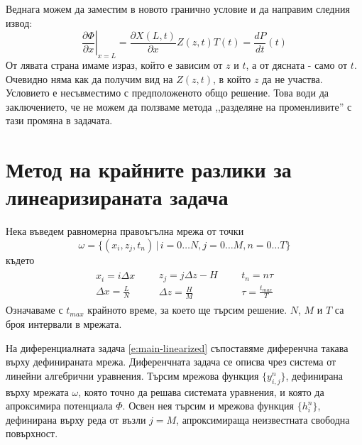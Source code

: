 \documentclass[12pt]{article}
\numberwithin{equation}{section}
\begin{document}
Веднага можем да заместим в новото гранично условие и да направим следния извод:
\begin{equation}
    \left. \frac{\partial\Phi}{\partial x} \right|_{x=L}
    = \frac{\partial X(L,t)}{\partial x}Z(z,t)T(t) = \frac{d P}{d t}(t)
\end{equation}
От лявата страна имаме израз, който е зависим от $z$ и $t$, а от дясната - само от $t$. Очевидно няма как да получим вид на $Z(z,t)$, в който $z$ да не участва. Условието е несъвместимо с предположеното общо решение. Това води да заключението, че не можем да ползваме метода ,,разделяне на променливите'' с тази промяна в задачата.

\section{Метод на крайните разлики за линеаризираната задача}
Нека въведем равномерна правоъгълна мрежа от точки
\begin{equation*}
    \omega=\{(x_i,z_j, t_n) \, | \, i=0\dots N, j=0\dots M, n=0\dots T \}
\end{equation*}
където
\begin{align*}
    \begin{gathered}
        x_i=i\Delta x \\
        \Delta x=\frac{L}{N}
    \end{gathered} &&
    \begin{gathered}
        z_j=j\Delta z - H \\
        \Delta z=\frac{H}{M}
    \end{gathered} &&
    \begin{gathered}
        t_n=n \tau \\
        \tau=\frac{t_{max}}{T}
    \end{gathered}
\end{align*}
Означаваме с $t_{max}$ крайното време, за което ще търсим решение. $N$, $M$ и $T$ са броя интервали в мрежата.

На диференциалната задача \autoref{e:main-linearized} съпоставяме диференчна такава върху дефинираната мрежа. Диференчната задача се описва чрез система от линейни алгебрични уравнения. Търсим мрежова функция $\{y^n_{i,j}\}$, дефинирана върху мрежата $\omega$, която точно да решава системата уравнения, и която да апроксимира потенциала $\Phi$. Освен нея търсим и мрежова функция $\{h^n_i\}$, дефинирана върху реда от възли $j=M$, апроксимираща неизвестната свободна повърхност.
\end{document}
